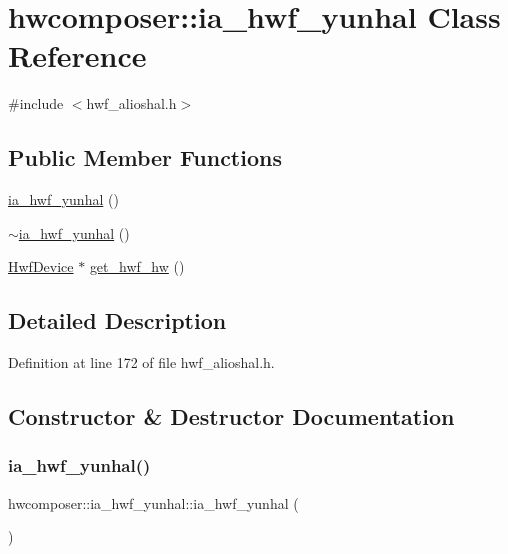 \hypertarget{classhwcomposer_1_1ia__hwf__yunhal}{}\section{hwcomposer\+:\+:ia\+\_\+hwf\+\_\+yunhal Class Reference}
\label{classhwcomposer_1_1ia__hwf__yunhal}


{\ttfamily \#include $<$hwf\+\_\+alioshal.\+h$>$}

\subsection*{Public Member Functions}
\begin{DoxyCompactItemize}
\item 
\mbox{\hyperlink{classhwcomposer_1_1ia__hwf__yunhal_af5afbd95acb262411e2e5a7d71a6aa4e}{ia\+\_\+hwf\+\_\+yunhal}} ()
\item 
\mbox{\hyperlink{classhwcomposer_1_1ia__hwf__yunhal_aa9e8f2cb623db54a19932c5939f6b739}{$\sim$ia\+\_\+hwf\+\_\+yunhal}} ()
\item 
\mbox{\hyperlink{structhwcomposer_1_1HwfDevice}{Hwf\+Device}} $\ast$ \mbox{\hyperlink{classhwcomposer_1_1ia__hwf__yunhal_ab9de8cdc6e6fc4bbb2eb354afa86a597}{get\+\_\+hwf\+\_\+hw}} ()
\end{DoxyCompactItemize}


\subsection{Detailed Description}


Definition at line 172 of file hwf\+\_\+alioshal.\+h.



\subsection{Constructor \& Destructor Documentation}
\mbox{\label{classhwcomposer_1_1ia__hwf__yunhal_af5afbd95acb262411e2e5a7d71a6aa4e}} 
\subsubsection{\texorpdfstring{ia\+\_\+hwf\+\_\+yunhal()}{ia\_hwf\_yunhal()}}
{\footnotesize\ttfamily hwcomposer\+::ia\+\_\+hwf\+\_\+yunhal\+::ia\+\_\+hwf\+\_\+yunhal (\begin{DoxyParamCaption}{ }\end{DoxyParamCaption})}

